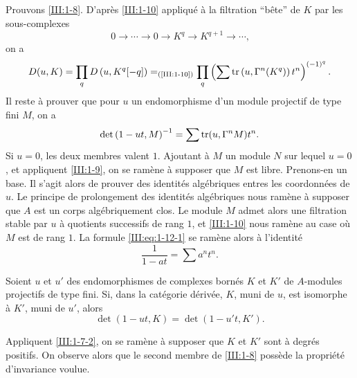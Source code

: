 \subsection{}\label{III:1-12}

Prouvons \ref{III:1-8}. D'apr\`es \ref{III:1-10} appliqu\'e \`a la filtration 
``b\^ete'' de $K$ par les sous-complexes 
\[
  0 \to \cdots \to 0 \to K^q \to K^{q+1} \to \cdots \text{,}
\]
on a 
\[
  D(u,K) = \prod_q D\left(u,K^q[-q]\right) =_{\text{(\ref{III:1-10})}} \prod_q \left(\sum \operatorname{tr}\left(u,\Gamma^n(K^q)\right) t^n \right)^{(-1)^q} \text{.}
\]
Il reste \`a prouver que pour $u$ un endomorphisme d'un module projectif de type 
fini $M$, on a 
\begin{equation}\label{III:eq:1-12-1}
  \det\left(1-u t,M\right)^{-1} = \sum \operatorname{tr}(u,\Gamma^n M) t^n \text{.}
\end{equation}
Si $u=0$, les deux membres valent $1$. Ajoutant \`a $M$ un module $N$ sur lequel 
$u=0$, et appliquent \ref{III:1-9}, on se ram\`ene \`a supposer que $M$ est libre. 
Prenons-en un base. Il s'agit alors de prouver des identit\'es alg\'ebriques 
entres les coordonn\'ees de $u$. Le principe de prolongement des identit\'es 
alg\'ebriques nous ram\`ene \`a supposer que $A$ est un corps alg\'ebriquement 
clos. Le module $M$ admet alors une filtration stable par $u$ \`a quotients 
successifs de rang $1$, et \ref{III:1-10} nous ram\`ene au case o\`u $M$ est de 
rang $1$. La formule \eqref{III:eq:1-12-1} se ram\`ene alors \`a l'identit\'e 
\[
  \frac{1}{1-a t} = \sum a^n t^n \text{.}
\]





\begin{corollary_}\label{III:1-13}
Soient $u$ et $u'$ des endomorphismes de complexes born\'es $K$ et $K'$ de 
$A$-modules projectifs de type fini. Si, dans la cat\'egorie d\'eriv\'ee, $K$, 
muni de $u$, est isomorphe \`a $K'$, muni de $u'$, alors 
\[
  \det(1-u t,K) = \det(1-u' t,K') \text{.}
\]
\end{corollary_}

Appliquent \ref{III:1-7-2}, on se ram\`ene \`a supposer que $K$ et $K'$ sont \`a 
degr\'es positifs. On observe alors que le second membre de \ref{III:1-8} 
poss\`ede la propri\'et\'e d'invariance voulue. 





\subsection{}\label{III:1-14}

